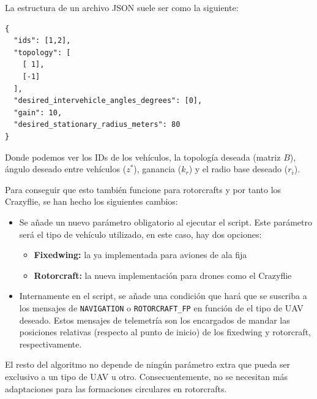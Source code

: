 La estructura de un archivo JSON suele ser como la siguiente:

\begin{lstlisting}[style=CodigoC]
{
  "ids": [1,2],
  "topology": [
    [ 1],
    [-1]
  ],
  "desired_intervehicle_angles_degrees": [0],
  "gain": 10,
  "desired_stationary_radius_meters": 80
}
\end{lstlisting}

Donde podemos ver los IDs de los vehículos, la topología deseada (matriz $B$), 
ángulo deseado entre vehículos ($z^*$), ganancia ($k_r$) y el radio base deseado ($r_i$).

Para conseguir que esto también funcione para rotorcrafts y por tanto los Crazyflie, 
se han hecho los siguientes cambios:

\begin{itemize}
    \item Se añade un nuevo parámetro obligatorio al ejecutar el script.
    Este parámetro será el tipo de vehículo utilizado, en este caso, hay dos opciones:
    \begin{itemize}
        \item \textbf{Fixedwing:} la ya implementada para aviones de ala fija
        \item \textbf{Rotorcraft:} la nueva implementación para drones como el Crazyflie
    \end{itemize}
    \item Internamente en el script, se añade una condición que hará que se suscriba a los mensajes
    de \texttt{NAVIGATION} o \texttt{ROTORCRAFT\_FP} en función de el tipo de UAV deseado.
    Estos mensajes de telemetría son los encargados de mandar las posiciones relativas 
    (respecto al punto de inicio) de los fixedwing y rotorcraft, respectivamente. 
\end{itemize}

El resto del algoritmo no depende de ningún parámetro extra que pueda ser exclusivo a un tipo de UAV u otro.
Consecuentemente, no se necesitan más adaptaciones para las formaciones circulares en rotorcrafts.


